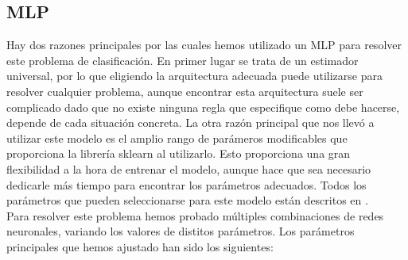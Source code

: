 \documentclass[journal,twoside]{JoPhA}
\begin{document}
\subsection{MLP}
Hay dos razones principales por las cuales hemos utilizado un MLP para resolver este problema de clasificación. En primer lugar se trata de un estimador universal, por lo que eligiendo la arquitectura adecuada puede utilizarse para resolver cualquier problema, aunque encontrar esta arquitectura suele ser complicado dado que no existe ninguna regla que especifique como debe hacerse, depende de cada situación concreta. La otra razón principal que nos llevó a utilizar este modelo es el amplio rango de parámeros modificables que proporciona la librería sklearn al utilizarlo. Esto proporciona una gran flexibilidad a la hora de entrenar el modelo, aunque hace que sea necesario dedicarle más tiempo para encontrar los parámetros adecuados. Todos los parámetros que pueden seleccionarse para este modelo están descritos en \cite{mlp}. \\

Para resolver este problema hemos probado múltiples combinaciones de redes neuronales, variando los valores de distitos parámetros. Los parámetros principales que hemos ajustado han sido los siguientes: \\
\end{document}
